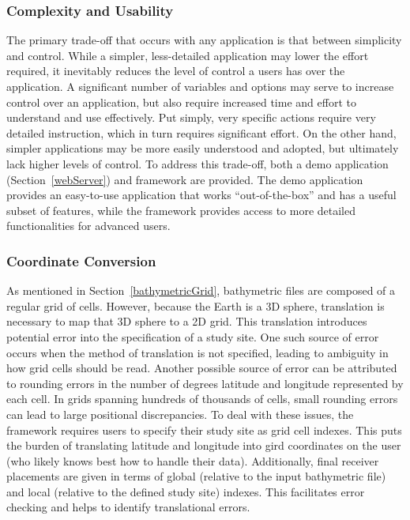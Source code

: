 \subsubsection{Complexity and Usability}
The primary trade-off that occurs with any application is that between simplicity and control.  While a simpler, less-detailed application may lower the effort required, it inevitably reduces the level of control a users has over the application.  A significant number of variables and options may serve to increase control over an application, but also require increased time and effort to understand and use effectively.  Put simply, very specific actions require very detailed instruction, which in turn requires significant effort.  On the other hand, simpler applications may be more easily understood and adopted, but ultimately lack higher levels of control.  To address this trade-off, both a demo application (Section~\ref{webServer}) and framework are provided.  The demo application provides an easy-to-use application that works ``out-of-the-box'' and has a useful subset of features, while the framework provides access to more detailed functionalities for advanced users.

\subsubsection{Coordinate Conversion}
As mentioned in Section~\ref{bathymetricGrid}, bathymetric files are composed of a regular grid of cells.  However, because the Earth is a 3D sphere, translation is necessary to map that 3D sphere to a 2D grid.  This translation introduces potential error into the specification of a study site.  One such source of error occurs when the method of translation is not specified, leading to ambiguity in how grid cells should be read.  Another possible source of error can be attributed to rounding errors in the number of degrees latitude and longitude represented by each cell.  In grids spanning hundreds of thousands of cells, small rounding errors can lead to large positional discrepancies.  To deal with these issues, the framework requires users to specify their study site as grid cell indexes.  This puts the burden of translating latitude and longitude into gird coordinates on the user (who likely knows best how to handle their data).  Additionally, final receiver placements are given in terms of global (relative to the input bathymetric file) and local (relative to the defined study site) indexes.  This facilitates error checking and helps to identify translational errors.  


